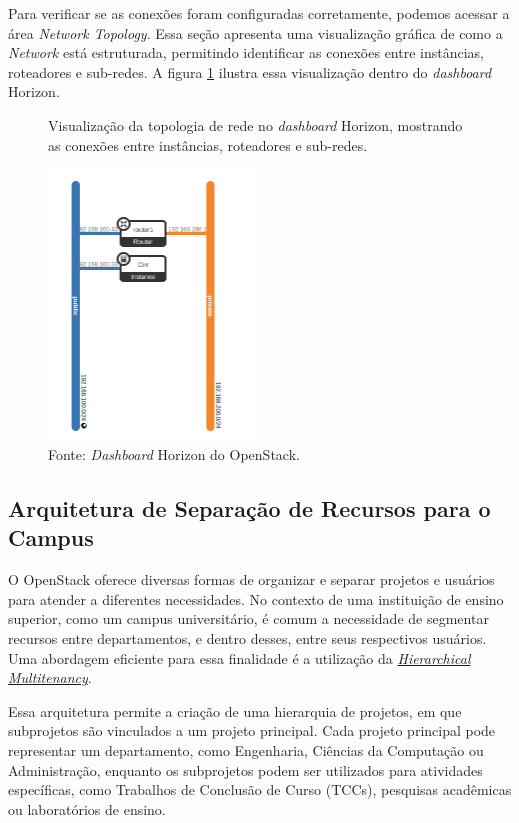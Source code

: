 Para verificar se as conexões foram configuradas corretamente, podemos acessar a área \textit{Network Topology}. Essa seção apresenta uma visualização gráfica de como a \textit{Network} está estruturada, permitindo identificar as conexões entre instâncias, roteadores e sub-redes. A figura \ref{fig:network_topology} ilustra essa visualização dentro do \textit{dashboard} Horizon.

\begin{figure}[htbp]
    \centering
    \caption{Visualização da topologia de rede no \textit{dashboard} Horizon, mostrando as conexões entre instâncias, roteadores e sub-redes.}
    \includegraphics[width=0.5\textwidth]{images/network_topology.png}
    \caption*{Fonte: \textit{Dashboard} Horizon do OpenStack.}
    \label{fig:network_topology}
\end{figure}

\subsection{Arquitetura de Separação de Recursos para o Campus}

O OpenStack oferece diversas formas de organizar e separar projetos e usuários para atender a diferentes necessidades. No contexto de uma instituição de ensino superior, como um campus universitário, é comum a necessidade de segmentar recursos entre departamentos, e dentro desses, entre seus respectivos usuários. Uma abordagem eficiente para essa finalidade é a utilização da \href{https://wiki.openstack.org/wiki/HierarchicalMultitenancy}{\textit{Hierarchical Multitenancy}}.

Essa arquitetura permite a criação de uma hierarquia de projetos, em que subprojetos são vinculados a um projeto principal. Cada projeto principal pode representar um departamento, como Engenharia, Ciências da Computação ou Administração, enquanto os subprojetos podem ser utilizados para atividades específicas, como Trabalhos de Conclusão de Curso (TCCs), pesquisas acadêmicas ou laboratórios de ensino. 

